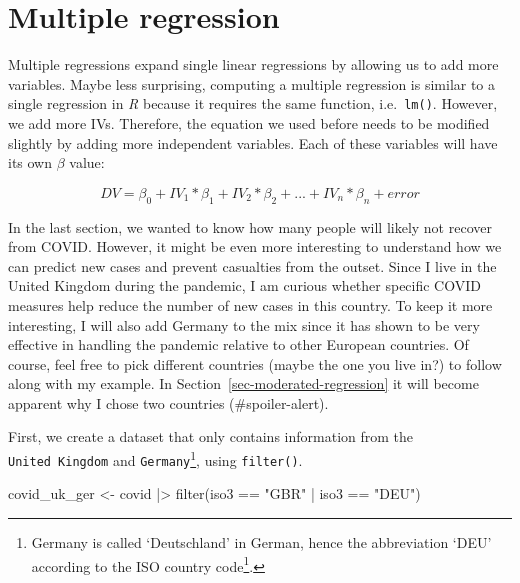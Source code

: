 \documentclass[
  letterpaper,
]{krantz}
\makeatletter
\newenvironment{Shaded}{\begin{snugshade}}{\end{snugshade}}
\newcommand{\FunctionTok}[1]{\textcolor[rgb]{0.28,0.35,0.67}{#1}}
\newcommand{\NormalTok}[1]{\textcolor[rgb]{0.00,0.23,0.31}{#1}}
\newcommand{\OtherTok}[1]{\textcolor[rgb]{0.00,0.23,0.31}{#1}}
\newcommand{\SpecialCharTok}[1]{\textcolor[rgb]{0.37,0.37,0.37}{#1}}
\newcommand{\StringTok}[1]{\textcolor[rgb]{0.13,0.47,0.30}{#1}}
\renewcommand{\href}[2]{#2\footnote{\url{#1}}}
\newenvironment{kframe}{%
\medskip{}
\setlength{\fboxsep}{.8em}
 \def\at@end@of@kframe{}%
 \ifinner\ifhmode%
  \def\at@end@of@kframe{\end{minipage}}%
  \begin{minipage}{\columnwidth}%
 \fi\fi%
 \def\FrameCommand##1{\hskip\@totalleftmargin \hskip-\fboxsep
 \colorbox{shadecolor}{##1}\hskip-\fboxsep
     \hskip-\linewidth \hskip-\@totalleftmargin \hskip\columnwidth}%
 \MakeFramed {\advance\hsize-\width
   \@totalleftmargin\z@ \linewidth\hsize
   \@setminipage}}%
 {\par\unskip\endMakeFramed%
 \at@end@of@kframe}
\renewenvironment{Shaded}{\begin{kframe}}{\end{kframe}}
\makeatother
\begin{document}
\section{Multiple regression}\label{sec-multiple-regression}

Multiple regressions expand single linear regressions by allowing us to
add more variables. Maybe less surprising, computing a multiple
regression is similar to a single regression in \emph{R} because it
requires the same function, i.e.~\texttt{lm()}. However, we add more
IVs. Therefore, the equation we used before needs to be modified
slightly by adding more independent variables. Each of these variables
will have its own \(\beta\) value:

\[
DV = \beta_{0} + IV_{1} * \beta_{1} + IV_{2} * \beta_{2} + ... + IV_{n} * \beta_{n} + error
\]

In the last section, we wanted to know how many people will likely not
recover from COVID. However, it might be even more interesting to
understand how we can predict new cases and prevent casualties from the
outset. Since I live in the United Kingdom during the pandemic, I am
curious whether specific COVID measures help reduce the number of new
cases in this country. To keep it more interesting, I will also add
Germany to the mix since it has shown to be very effective in handling
the pandemic relative to other European countries. Of course, feel free
to pick different countries (maybe the one you live in?) to follow along
with my example. In Section~\ref{sec-moderated-regression} it will
become apparent why I chose two countries (\#spoiler-alert).

First, we create a dataset that only contains information from the
\texttt{United\ Kingdom} and \texttt{Germany}\footnote{Germany is called
  `Deutschland' in German, hence the abbreviation `DEU' according to the
  \href{https://www.iso.org/obp/ui/\#iso:code:3166:DE}{ISO country
  code}.}, using \texttt{filter()}.

\begin{Shaded}
\begin{Highlighting}[]
\NormalTok{covid\_uk\_ger }\OtherTok{\textless{}{-}}
\NormalTok{  covid }\SpecialCharTok{|\textgreater{}}
  \FunctionTok{filter}\NormalTok{(iso3 }\SpecialCharTok{==} \StringTok{"GBR"} \SpecialCharTok{|}\NormalTok{ iso3 }\SpecialCharTok{==} \StringTok{"DEU"}\NormalTok{)}
\end{Highlighting}
\end{Shaded}
\end{document}
